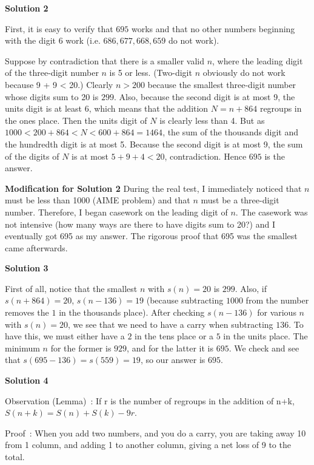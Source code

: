 \begin{enumerate}
\textbf{Solution 2}

First, it is easy to verify that $695$ works and that no other numbers beginning with the digit 6 work (i.e. $686, 677, 668, 659$ do not work).

 Suppose by contradiction that there is a smaller valid $n$, where the leading digit of the three-digit number $n$ is 5 or less. (Two-digit $n$ obviously do not work because 9 + 9 < 20.) Clearly $n > 200$ because the smallest three-digit number whose digits sum to 20 is $299$. Also, because the second digit is at most 9, the units digit is at least 6, which means that the addition $N = n + 864$ regroups in the ones place. Then the units digit of $N$ is clearly less than 4. But as $1000 < 200 + 864 < N < 600 + 864 = 1464$, the sum of the thousands digit and the hundredth digit is at most 5. Because the second digit is at most 9, the sum of the digits of $N$ is at most $5 + 9 + 4 < 20$, contradiction. Hence $\boxed{695}$ is the answer.

 \textbf{Modification for Solution 2} During the real test, I immediately noticed that $n$ must be less than 1000 (AIME problem) and that $n$ must be a three-digit number. Therefore, I began casework on the leading digit of $n$. The casework was not intensive (how many ways are there to have digits sum to 20?) and I eventually got 695 as my answer. The rigorous proof that 695 was the smallest came afterwards.

 



\textbf{Solution 3}

First of all, notice that the smallest $n$ with $s(n) = 20$ is $299$. Also, if $s(n + 864) = 20$, $s(n - 136) = 19$ (because subtracting $1000$ from the number removes the $1$ in the thousands place). After checking $s(n - 136)$ for various $n$ with $s(n) = 20$, we see that we need to have a carry when subtracting $136$. To have this, we must either have a $2$ in the tens place or a $5$ in the units place. The minimum $n$ for the former is $929$, and for the latter it is $695$. We check and see that $s(695-136) = s(559) = 19$, so our answer is $\boxed{695}$.

 



\textbf{Solution 4}

Observation (Lemma) : If r is the number of regroups in the addition of n+k, $S(n+k) = S(n)+S(k)-9r$. 

 Proof :  When you add two numbers, and you do a carry, you are taking away 10 from 1 column, and adding 1 to another column, giving a net loss of 9 to the total.


\end{enumerate}
